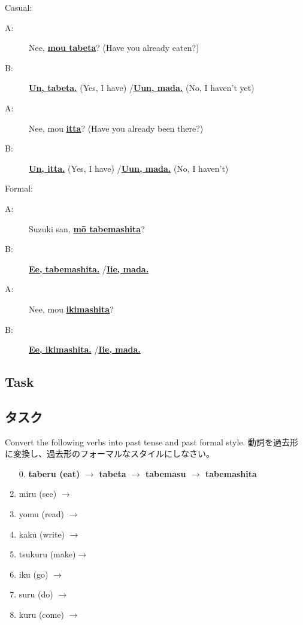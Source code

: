 \documentclass[uplatex,dvipdfmx,b5paper,english,10pt]{jsbook}
\begin{document}
\begin{description}
\item Casual:
\begin{description}
 \item[A:] Nee, \underline{{\bfseries mou tabeta}}? (Have you already eaten?)
 \item[B:] \underline{{\bfseries Un, tabeta.}} (Yes, I have) /\underline{{\bfseries Uun, mada.}} (No, I haven't yet)
 \item[A:] Nee, mou \underline{{\bfseries itta}}? (Have you already been there?)
 \item[B:] \underline{{\bfseries Un, itta.}} (Yes, I have) /\underline{{\bfseries Uun, mada.}} (No, I haven't)
\end{description}
\item Formal:
\begin{description}
 \item[A:] Suzuki san, \underline{{\bfseries m\=o  tabemashita}}?
 \item[B:] \underline{{\bfseries Ee, tabemashita.}} /\underline{{\bfseries Iie, mada.}}
 \item[A:] Nee, mou \underline{{\bfseries ikimashita}}?
 \item[B:] \underline{{\bfseries Ee, ikimashita.}} /\underline{{\bfseries Iie, mada.}}
\end{description}
\end{description}

\ifEnglish
\subsection{Task}
\else
\subsection{タスク}
\fi

\begin{toiquestion}
\ifEnglish
Convert the following verbs into past tense and past formal style.
\else
動詞を過去形に変換し、過去形のフォーマルなスタイルにしなさい。
\fi
\end{toiquestion}

\begin{enumerate}
  \item[0.] {\bfseries taberu (eat) $\rightarrow$ tabeta $\rightarrow$ tabemasu $\rightarrow$ tabemashita}\hrulefill
  \item miru (see)    $\rightarrow$ \hrulefill
  \item yomu (read)   $\rightarrow$ \hrulefill
  \item kaku (write)  $\rightarrow$ \hrulefill
  \item tsukuru (make)$\rightarrow$ \hrulefill
  \item iku  (go)     $\rightarrow$ \hrulefill
  \item suru (do)     $\rightarrow$ \hrulefill
  \item kuru (come)   $\rightarrow$ \hrulefill
\end{enumerate}
\end{document}
